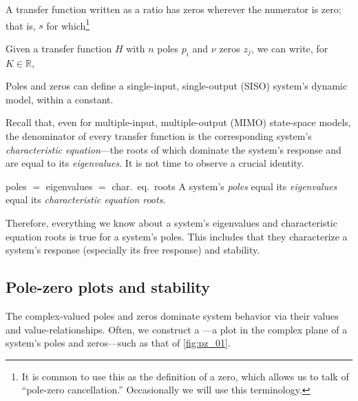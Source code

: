 \documentclass[dynamic_systems.tex]{subfiles}
\begin{document}
A transfer function written as a ratio has zeros wherever the numerator is zero; that is, $s$ for which\footnote{It is common to use this as the definition of a zero, which allows us to talk of ``pole-zero cancellation.'' Occasionally we will use this terminology.}

Given a transfer function $H$ with $n$ poles $p_i$ and $\nu$ zeros $z_j$, we can write, for $K\in\mathbb{R}$,

Poles and zeros can define a single-input, single-output (SISO) system's dynamic model, within a constant.
\tags{}

Recall that, even for multiple-input, multiple-output (MIMO) state-space models, the denominator of every transfer function is the corresponding system's \emph{characteristic equation}---the roots of which dominate the system's response and are equal to its \emph{eigenvalues}.
It is not time to observe a crucial identity.
\tags{}

\begin{Corollary}{poles $=$ eigenvalues $=$ char.\ eq.\ roots}{}
A system's \emph{poles} equal its \emph{eigenvalues} equal its \emph{characteristic equation roots}.
\end{Corollary}

Therefore, everything we know about a system's eigenvalues and characteristic equation roots is true for a system's poles.
This includes that they characterize a system's response (especially its free response) and stability.
\tags{}

\subsection{Pole-zero plots and stability}
\tags{}

The complex-valued poles and zeros dominate system behavior via their values and value-relationships.
Often, we construct a ---a plot in the complex plane of a system's poles and zeros---such as that of \cref{fig:pz_01}.
\tags{}
\end{document}
